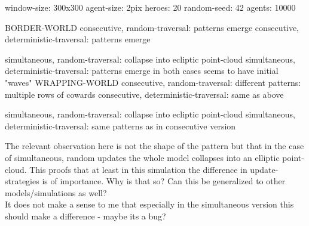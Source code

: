 window-size:	300x300
agent-size:		2pix
heroes: 		20%
random-seed: 	42
agents:			10000


BORDER-WORLD
	consecutive, random-traversal: 					patterns emerge
	consecutive, deterministic-traversal: 			patterns emerge

	simultaneous, random-traversal:					collapse into ecliptic point-cloud
	simultaneous, deterministic-traversal: 			patterns emerge
													in both cases seems to have initial "waves"
WRAPPING-WORLD
	consecutive, random-traversal: 					different patterns: multiple rows of cowards
	consecutive, deterministic-traversal: 			same as above

	simultaneous, random-traversal:					collapse into ecliptic point-cloud
	simultaneous, deterministic-traversal: 			same patterns as in consecutive version
	
The relevant observation here is not the shape of the pattern but that in the case of simultaneous, random updates the whole model collapses into an elliptic point-cloud. This proofs that at least in this simulation the difference in update-strategies is of importance. Why is that so? Can this be generalized to other models/simulations as well? \\
It does not make a sense to me that especially in the simultaneous version this should make a difference - maybe its a bug?